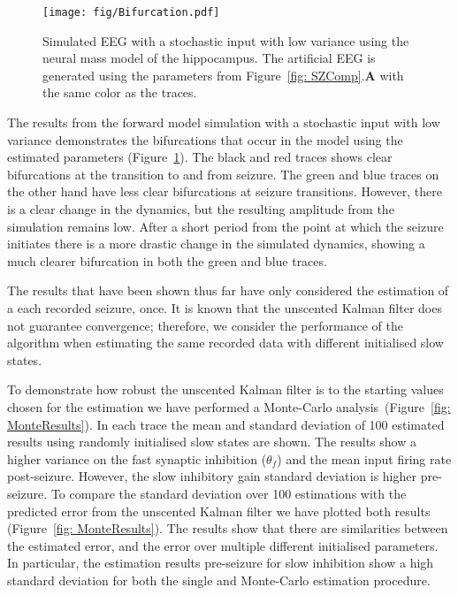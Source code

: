  \begin{figure}[ht]
 	\centering
 		\texttt{[image: fig/Bifurcation.pdf]}
 	\caption{Simulated EEG with a stochastic input with low variance using the neural mass model of the hippocampus. The artificial EEG is generated using the parameters from Figure~\ref{fig: SZComp}.\textbf{A} with the same color as the traces.}
 	\label{fig: Bifur}
 \end{figure}

The results from the forward model simulation with a stochastic input with low variance demonstrates the bifurcations that occur in the model using the estimated parameters (Figure~\ref{fig: Bifur}). The black and red traces shows clear bifurcations at the transition to and from seizure. The green and blue traces on the other hand have less clear bifurcations at seizure transitions. However, there is a clear change in the dynamics, but the resulting amplitude from the simulation remains low. After a short period from the point at which the seizure initiates there is a more drastic change in the simulated dynamics, showing a much clearer bifurcation in both the green and blue traces.  

The results that have been shown thus far have only considered the estimation of a each recorded seizure, once. It is known that the unscented Kalman filter does not guarantee convergence; therefore, we consider the performance of the algorithm when estimating the same recorded data with different initialised slow states.  

To demonstrate how robust the unscented Kalman filter is to the starting values chosen for the estimation we have performed a Monte-Carlo analysis~(Figure~\ref{fig: MonteResults}). In each trace the mean and standard deviation of 100 estimated results using randomly initialised slow states are shown. The results show a higher variance on the fast synaptic inhibition ($\theta_f$) and the mean input firing rate post-seizure. However, the slow inhibitory gain standard deviation is higher pre-seizure. To compare the standard deviation over 100 estimations with the predicted error from the unscented Kalman filter we have plotted both results (Figure~\ref{fig: MonteResults}). The results show that there are similarities between the estimated error, and the error over multiple different initialised parameters. In particular, the estimation results pre-seizure for slow inhibition show a high standard deviation for both the single and Monte-Carlo estimation procedure.

